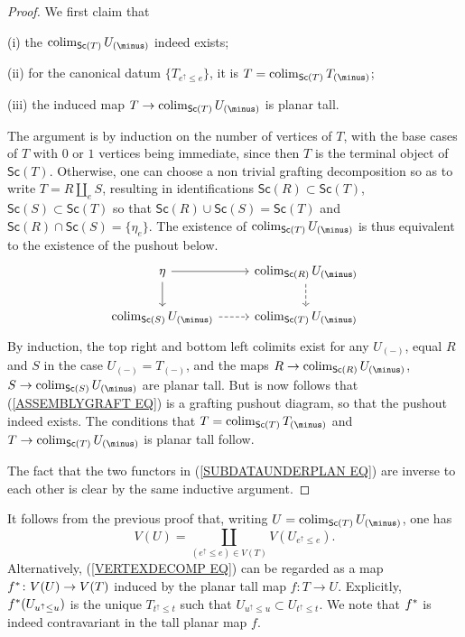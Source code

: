 \documentclass[a4paper,10pt]{article}%
\begin{document}
\begin{proof}
We first claim that
\begin{inparaenum}
\item[(i)] the $\colim_{\mathsf{Sc}(T)} U_{(\minus)}$ indeed exists;
\item[(ii)] for the canonical datum $\{T_{e^{\uparrow}\leq e}\}$, it is $T = \colim_{\mathsf{Sc}(T)} T_{(\minus)}$;
\item[(iii)] the induced map
$T \to \colim_{\mathsf{Sc}(T)} U_{(\minus)}$ is planar tall.
\end{inparaenum}
 
The argument is by induction on the number of vertices of $T$, with the base cases of $T$ with $0$ or $1$ vertices being immediate, since then $T$ is the terminal object of $\mathsf{Sc}(T)$.
Otherwise, one can choose a non trivial grafting decomposition so as to write $T = R \amalg_e S$, resulting 
in identifications 
$\mathsf{Sc}(R) \subset \mathsf{Sc}(T)$, 
$\mathsf{Sc}(S) \subset \mathsf{Sc}(T)$
so that 
$\mathsf{Sc}(R) \cup \mathsf{Sc}(S) = \mathsf{Sc}(T)$
and 
$\mathsf{Sc}(R) \cap \mathsf{Sc}(S) = \{\eta_e \}$.
The existence of $\colim_{\mathsf{Sc}(T)}U_{(\minus)}$
is thus equivalent to the existence of the pushout below.
\begin{equation}\label{ASSEMBLYGRAFT EQ}
\begin{tikzcd}
	\eta \ar{r} \ar{d} & \colim_{\mathsf{Sc}(R)}U_{(\minus)} \ar[dashed,d]
\\
	\colim_{\mathsf{Sc}(S)}U_{(\minus)} \ar[dashed,r] &
	\colim_{\mathsf{Sc}(T)}U_{(\minus)}
\end{tikzcd}
\end{equation}
By induction, the top right and bottom left colimits exist for any $U_{(\minus)}$, 
equal $R$ and $S$ in the case $U_{(\minus)} = T_{(\minus)}$,
and the maps 
$R \to \colim_{\mathsf{Sc}(R)}U_{(\minus)}$,
$S \to \colim_{\mathsf{Sc}(S)}U_{(\minus)}$
are planar tall.
But is now follows that (\ref{ASSEMBLYGRAFT EQ}) is a grafting pushout diagram, so that the pushout indeed exists. The conditions that
$T = \colim_{\mathsf{Sc}(T)}T_{(\minus)}$
and 
$T \to \colim_{\mathsf{Sc}(T)}U_{(\minus)}$
is planar tall follow.

The fact that the two functors in (\ref{SUBDATAUNDERPLAN EQ})
are inverse to each other is clear by the same inductive argument.
\end{proof}


\begin{remark}\label{VERTEXDECOMP REM}
	It follows from the previous proof that, writing 
	$U = \colim_{\mathsf{Sc}(T)}U_{(\minus)}$,
	one has 
\begin{equation}\label{VERTEXDECOMP EQ}
	V(U) = \coprod_{(e^{\uparrow} \leq e) \in V(T)}
	V(U_{e^{\uparrow} \leq e}).
\end{equation}
Alternatively, (\ref{VERTEXDECOMP EQ}) can be regarded as a map 
$f^{\**} \colon V(U) \to V(T)$ induced by the planar tall map 
$f \colon T \to U$.
Explicitly, $f^{\**}(U_{u^{\uparrow} \leq u})$ 
is the unique $T_{t^{\uparrow}\leq t}$ such that
$U_{u^{\uparrow} \leq u} \subset U_{t^{\uparrow} \leq t}$. We note that $f^{\**}$ is indeed contravariant in the tall planar map $f$.
\end{remark}
\end{document}
